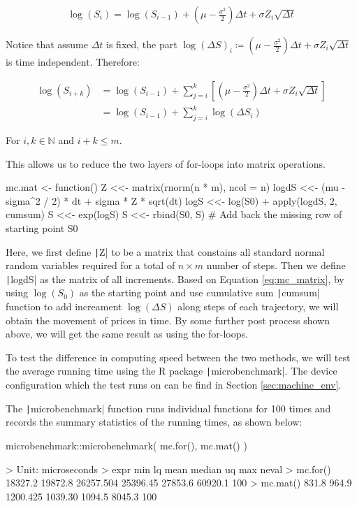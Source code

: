 \begin{align*}
\log(S_i) = \log(S_{i-1}) + (\mu - \frac{\sigma^2}{2})\Delta t + \sigma Z_i \sqrt{\Delta t}
\end{align*}

Notice that assume $\Delta t$ is fixed, the part $\log(\Delta S)_i\coloneqq(\mu - \frac{\sigma^2}{2})\Delta t + \sigma Z_i \sqrt{\Delta t}$ is time independent. Therefore:

\begin{align}
\log(S_{i+k}) &= \log(S_{i-1}) + \sum_{j=i}^{k}{\left[(\mu - \frac{\sigma^2}{2})\Delta t + \sigma Z_i \sqrt{\Delta t}\right]} \\
&= \log(S_{i-1}) + \sum_{j=i}^{k}{\log(\Delta S_i)} \label{eq:mc_matrix}
\end{align}

For $i,k\in\mathbb{N}$ and $i+k\leq m$.

This allows us to reduce the two layers of for-loops into matrix operations.

\begin{Rminted}
mc.mat <- function() {
    Z <<- matrix(rnorm(n * m), ncol = n)
    logdS <<- (mu - sigma^2 / 2) * dt + sigma * Z * sqrt(dt)
    logS <<- log(S0) + apply(logdS, 2, cumsum)
    S <<- exp(logS)
    S <<- rbind(S0, S) # Add back the missing row of starting point S0
}
\end{Rminted}

Here, we first define \texttt|Z| to be a matrix that constains all standard normal random variables required for a total of $n\times m$ number of steps. Then we define \texttt|logdS| as the matrix of all increments. Based on Equation \ref{eq:mc_matrix}, by using $\log(S_0)$ as the starting point and use cumulative sum \texttt|cumsum| function to add increament $\log(\Delta S)$ along steps of each trajectory, we will obtain the movement of prices in time. By some further post process shown above, we will get the same result as using the for-loops.

To test the difference in computing speed between the two methods, we will test the average running time using the R package \texttt|microbenchmark|. The device configuration which the test runs on can be find in Section \ref{sec:machine_env}.

The \texttt|microbenchmark| function runs individual functions for 100 times and records the summary statistics of the running times, as shown below:

\begin{Rminted}
microbenchmark::microbenchmark(
    mc.for(),
    mc.mat()
)

>     Unit: microseconds
>     expr     min      lq      mean   median      uq     max neval
> mc.for() 18327.2 19872.8 26257.504 25396.45 27853.6 60920.1   100
> mc.mat()   831.8   964.9  1200.425  1039.30  1094.5  8045.3   100
\end{Rminted}

